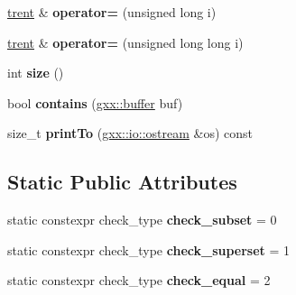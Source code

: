 \begin{DoxyCompactItemize}
\item 
\hyperlink{classgxx_1_1trent}{trent} \& {\bfseries operator=} (unsigned long i)\hypertarget{classgxx_1_1trent_a8e85e59c77afcb722cf8db15911d5a03}{}\label{classgxx_1_1trent_a8e85e59c77afcb722cf8db15911d5a03}

\item 
\hyperlink{classgxx_1_1trent}{trent} \& {\bfseries operator=} (unsigned long long i)\hypertarget{classgxx_1_1trent_aff60d10b10f3dba8efb2c3dfac745947}{}\label{classgxx_1_1trent_aff60d10b10f3dba8efb2c3dfac745947}

\item 
int {\bfseries size} ()\hypertarget{classgxx_1_1trent_ad670c32db885fc760a063f5dd6caed8b}{}\label{classgxx_1_1trent_ad670c32db885fc760a063f5dd6caed8b}

\item 
bool {\bfseries contains} (\hyperlink{classgxx_1_1buffer}{gxx\+::buffer} buf)\hypertarget{classgxx_1_1trent_a1267be341678b3c3b084eb2ca6681373}{}\label{classgxx_1_1trent_a1267be341678b3c3b084eb2ca6681373}

\item 
size\+\_\+t {\bfseries print\+To} (\hyperlink{classgxx_1_1io_1_1ostream}{gxx\+::io\+::ostream} \&os) const \hypertarget{classgxx_1_1trent_a89835eabd6d6b6582e057a525424947b}{}\label{classgxx_1_1trent_a89835eabd6d6b6582e057a525424947b}

\end{DoxyCompactItemize}
\subsection*{Static Public Attributes}
\begin{DoxyCompactItemize}
\item 
static constexpr check\+\_\+type {\bfseries check\+\_\+subset} = 0\hypertarget{classgxx_1_1trent_a9ab821f6d20dbaa86c4dd5b7a90564bd}{}\label{classgxx_1_1trent_a9ab821f6d20dbaa86c4dd5b7a90564bd}

\item 
static constexpr check\+\_\+type {\bfseries check\+\_\+superset} = 1\hypertarget{classgxx_1_1trent_a8bf7a54813f49b17afe2fdd33cdcf2d1}{}\label{classgxx_1_1trent_a8bf7a54813f49b17afe2fdd33cdcf2d1}

\item 
static constexpr check\+\_\+type {\bfseries check\+\_\+equal} = 2\hypertarget{classgxx_1_1trent_aa8d93eec4c223cc897ca3dca770eec10}{}\label{classgxx_1_1trent_aa8d93eec4c223cc897ca3dca770eec10}

\end{DoxyCompactItemize}
